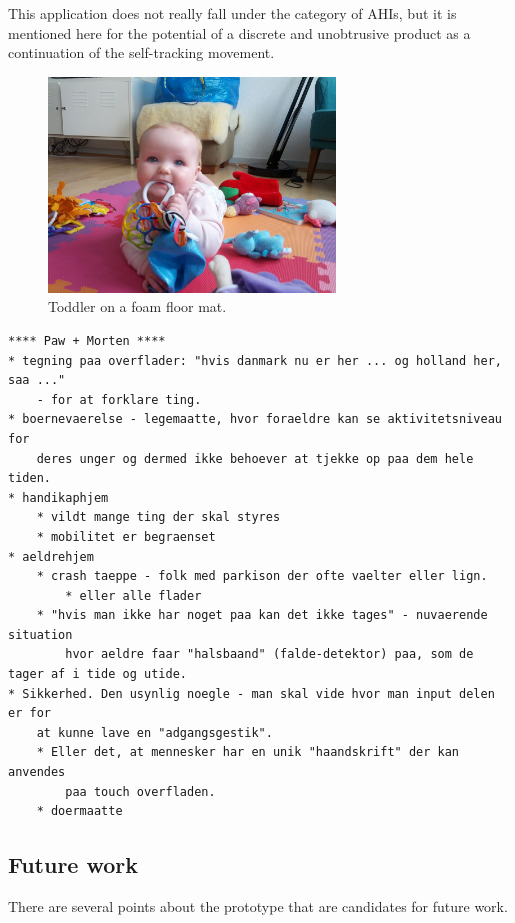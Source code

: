 This application does not really fall under the category of AHIs, but it is mentioned here for the potential of a discrete and unobtrusive product as a continuation of the self-tracking movement.


\begin{figure}[h]
  \centering
      \includegraphics[width=3in]{figures/touch/evaluation/softtiles}
  \caption[Toddler on a foam floor mat with puzzle-like tiles for extensibility.]
  {Toddler on a foam floor mat.}
  \label{fig:textiletouch:eval:softtiles}
\end{figure}

\begin{verbatim}
**** Paw + Morten ****
* tegning paa overflader: "hvis danmark nu er her ... og holland her, saa ..." 
	- for at forklare ting.
* boernevaerelse - legemaatte, hvor foraeldre kan se aktivitetsniveau for 
	deres unger og dermed ikke behoever at tjekke op paa dem hele tiden.
* handikaphjem
	* vildt mange ting der skal styres
    * mobilitet er begraenset
* aeldrehjem
    * crash taeppe - folk med parkison der ofte vaelter eller lign.
        * eller alle flader
    * "hvis man ikke har noget paa kan det ikke tages" - nuvaerende situation 
		hvor aeldre faar "halsbaand" (falde-detektor) paa, som de tager af i tide og utide.
* Sikkerhed. Den usynlig noegle - man skal vide hvor man input delen er for 
	at kunne lave en "adgangsgestik".
    * Eller det, at mennesker har en unik "haandskrift" der kan anvendes 
		paa touch overfladen.
    * doermaatte
\end{verbatim}

\subsection{Future work}
\label{ch:textiletouch:futurework}

There are several points about the prototype that are candidates for future work.

